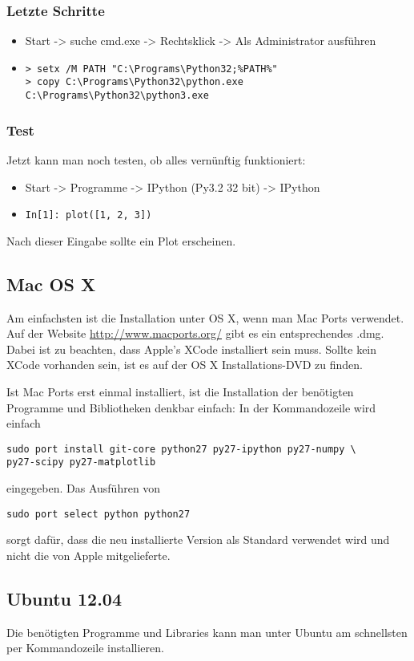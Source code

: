 \subsubsection{Letzte Schritte}
\begin{itemize}
  \item Start -> suche cmd.exe -> Rechtsklick -> Als Administrator ausführen
  \item
\begin{verbatim}
> setx /M PATH "C:\Programs\Python32;%PATH%"
> copy C:\Programs\Python32\python.exe C:\Programs\Python32\python3.exe
\end{verbatim}
\end{itemize}

\subsubsection{Test}
Jetzt kann man noch testen, ob alles vernünftig funktioniert:
\begin{itemize}
  \item Start -> Programme -> IPython (Py3.2 32 bit) -> IPython
  \item \texttt{In[1]: plot([1, 2, 3])}
\end{itemize}
Nach dieser Eingabe sollte ein Plot erscheinen.

\subsection{Mac OS X}
Am einfachsten ist die Installation unter OS X, wenn man Mac Ports verwendet.
Auf der Website \url{http://www.macports.org/} gibt es ein entsprechendes .dmg.
Dabei ist zu beachten, dass Apple's XCode installiert sein muss.
Sollte kein XCode vorhanden sein, ist es auf der OS X Installations-DVD zu finden.

Ist Mac Ports erst einmal installiert, ist die Installation der benötigten Programme und Bibliotheken denkbar einfach: In der Kommandozeile wird einfach
\begin{verbatim}
sudo port install git-core python27 py27-ipython py27-numpy \
py27-scipy py27-matplotlib
\end{verbatim}
eingegeben.
Das Ausführen von
\begin{verbatim}
sudo port select python python27
\end{verbatim}
sorgt dafür, dass die neu installierte Version als Standard verwendet wird und nicht die von Apple mitgelieferte.

\subsection{Ubuntu 12.04}
Die benötigten Programme und Libraries kann man unter Ubuntu am schnellsten per Kommandozeile installieren.


